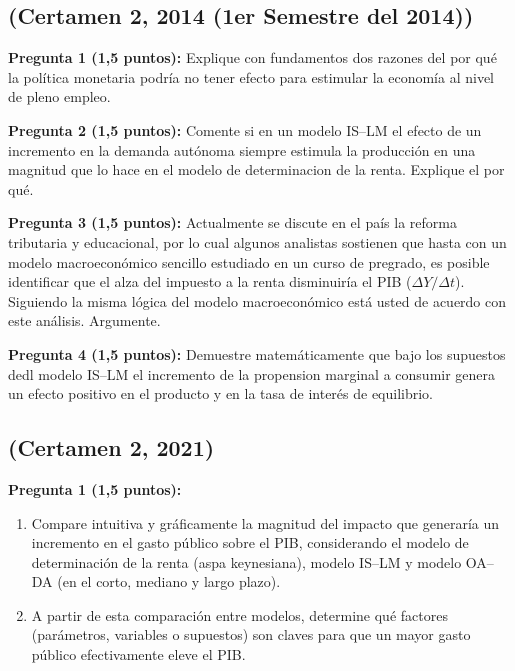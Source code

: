 \documentclass[11pt,addpoints]{article}
\begin{document}
\subsection*{(Certamen 2, 2014 (1er Semestre del 2014))}

\textbf{Pregunta 1 (1,5 puntos):}  
Explique con fundamentos dos razones del por qué la política monetaria podría no tener efecto para estimular la economía al nivel de pleno empleo.


\vspace{0.5cm}
\textbf{Pregunta 2 (1,5 puntos):}  
Comente si en un modelo IS–LM el efecto de un incremento en la demanda autónoma siempre estimula la producción en una magnitud que lo hace en el modelo de determinacion de la renta. Explique el por qué.


\vspace{0.5cm}
\textbf{Pregunta 3 (1,5 puntos):}  
Actualmente se discute en el país la reforma tributaria y educacional, por lo cual algunos analistas sostienen que hasta con un modelo macroeconómico sencillo estudiado en un curso de pregrado, es posible identificar que el alza del impuesto a la renta disminuiría el PIB (\( \Delta Y/\Delta t \)). Siguiendo la misma lógica del modelo macroeconómico está usted de acuerdo con este análisis. Argumente.

\vspace{0.5cm}
\textbf{Pregunta 4 (1,5 puntos):}  
Demuestre matemáticamente que bajo los supuestos dedl modelo IS–LM el incremento de la propension marginal a consumir genera un efecto positivo en el producto y en la tasa de interés de equilibrio.

\newpage
\vspace*{0.1cm}

\subsection*{(Certamen 2, 2021)}
\textbf{Pregunta 1 (1,5 puntos):}

\begin{enumerate}[label=\alph*)]
    \item Compare intuitiva y gráficamente la magnitud del impacto que generaría un incremento en el gasto público sobre el PIB, considerando el modelo de determinación de la renta (aspa keynesiana), modelo IS–LM y modelo OA–DA (en el corto, mediano y largo plazo). 
    \item  A partir de esta comparación entre modelos, determine qué factores (parámetros, variables o supuestos) son claves para que un mayor gasto público efectivamente eleve el PIB.  
\end{enumerate}
\end{document}
